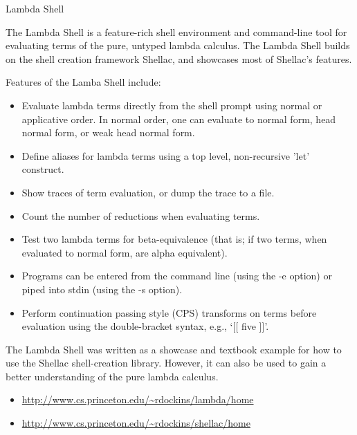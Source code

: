 \documentclass{article}
\begin{document}
\begin{hcarentry}{Lambda Shell}
\makeheader

The Lambda Shell is a feature-rich shell environment and command-line
tool for evaluating terms of the pure, untyped lambda calculus.  The Lambda
Shell builds on the shell creation framework Shellac, and showcases
most of Shellac's features.

Features of the Lamba Shell include:

\begin{itemize}
\item Evaluate lambda terms directly from the shell prompt using
      normal or applicative order.  In normal order, one can evaluate
      to normal form, head normal form, or weak head normal form.
\item Define aliases for lambda terms using a top level, non-recursive
      'let' construct.
\item Show traces of term evaluation, or dump the trace to a file.
\item Count the number of reductions when evaluating terms.
\item Test two lambda terms for beta-equivalence (that is; if two
      terms, when evaluated to normal form, are alpha equivalent).
\item Programs can be entered from the command line (using the -e option)
      or piped into stdin (using the -s option).
\item Perform continuation passing style (CPS) transforms on terms before
      evaluation using the double-bracket syntax, e.g.,  `[[ five ]]'.
\end{itemize}


The Lambda Shell was written as a showcase and textbook
example for how to use the Shellac shell-creation library.
However, it can also be used to gain a better understanding
of the pure lambda calculus.


\FurtherReading
\begin{itemize}
\item \url{http://www.cs.princeton.edu/~rdockins/lambda/home}
\item \url{http://www.cs.princeton.edu/~rdockins/shellac/home}
\end{itemize}
\end{hcarentry}
\end{document}
